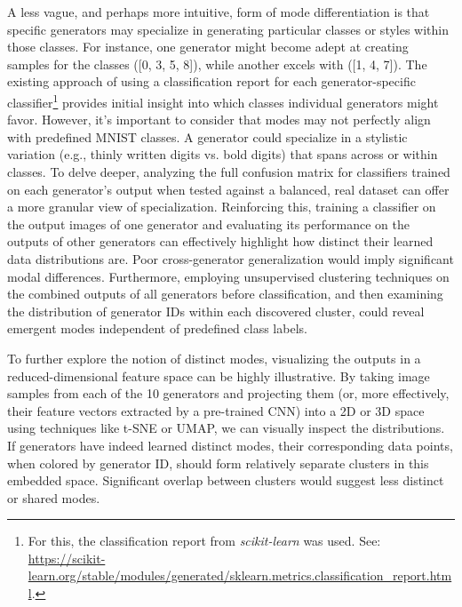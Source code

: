 A less vague, and perhaps more intuitive, form of mode differentiation is that specific generators may specialize in generating particular classes or styles within those classes. For instance, one generator might become adept at creating samples for the classes ([0, 3, 5, 8]), while another excels with ([1, 4, 7]). The existing approach of using a classification report for each generator-specific classifier\footnote{For this, the classification report from \textit{scikit-learn} was used. See: \url{https://scikit-learn.org/stable/modules/generated/sklearn.metrics.classification_report.html}.} provides initial insight into which classes individual generators might favor. However, it's important to consider that modes may not perfectly align with predefined MNIST classes. A generator could specialize in a stylistic variation (e.g., thinly written digits vs. bold digits) that spans across or within classes. To delve deeper, analyzing the full confusion matrix for classifiers trained on each generator's output when tested against a balanced, real dataset can offer a more granular view of specialization. Reinforcing this, training a classifier on the output images of one generator and evaluating its performance on the outputs of other generators can effectively highlight how distinct their learned data distributions are. Poor cross-generator generalization would imply significant modal differences. Furthermore, employing unsupervised clustering techniques on the combined outputs of all generators before classification, and then examining the distribution of generator IDs within each discovered cluster, could reveal emergent modes independent of predefined class labels.

To further explore the notion of distinct modes, visualizing the outputs in a reduced-dimensional feature space can be highly illustrative. By taking image samples from each of the 10 generators and projecting them (or, more effectively, their feature vectors extracted by a pre-trained CNN) into a 2D or 3D space using techniques like t-SNE or UMAP, we can visually inspect the distributions. If generators have indeed learned distinct modes, their corresponding data points, when colored by generator ID, should form relatively separate clusters in this embedded space. Significant overlap between clusters would suggest less distinct or shared modes.

